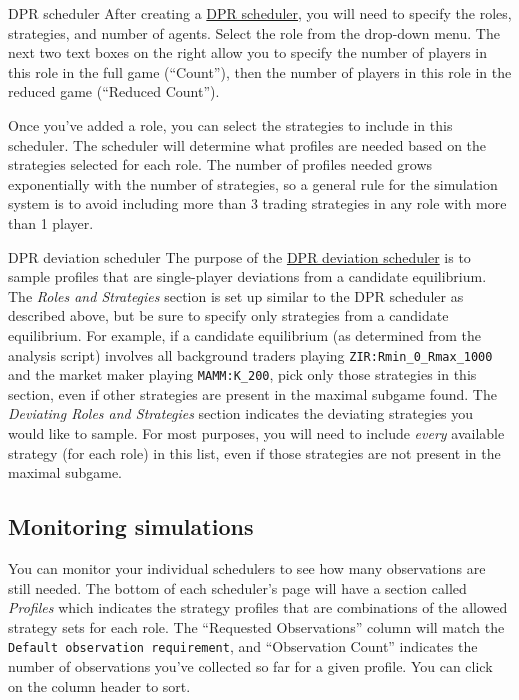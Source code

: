 \documentclass[11pt]{article}
\begin{document}
\begin{paragraph}{DPR scheduler}
After creating a \href{http://egtaonline.eecs.umich.edu/dpr_schedulers/new}{DPR scheduler}, you will need to specify the roles, strategies, and number of agents. Select the role from the drop-down menu. The next two text boxes on the right allow you to specify the number of players in this role in the full game (``Count''), then the number of players in this role in the reduced game (``Reduced Count''). 

Once you've added a role, you can select the strategies to include in this scheduler. The scheduler will determine what profiles are needed based on the strategies selected for each role.
The number of profiles needed grows exponentially with the number of strategies, so a general rule for the simulation system is to avoid including more than 3 trading strategies in any role with more than 1 player.
\end{paragraph}

\begin{paragraph}{DPR deviation scheduler}
The purpose of the \href{http://egtaonline.eecs.umich.edu/dpr_deviation_schedulers/new}{DPR deviation scheduler} is to sample profiles that are single-player deviations from a candidate equilibrium.
The \emph{Roles and Strategies} section is set up similar to the DPR scheduler as described above, but be sure to specify only strategies from a candidate equilibrium. For example, if a candidate equilibrium (as determined from the analysis script) involves all background traders playing \verb|ZIR:Rmin_0_Rmax_1000| and the market maker playing \verb|MAMM:K_200|, pick only those strategies in this section, even if other strategies are present in the maximal subgame found.
The \emph{Deviating Roles and Strategies} section indicates the deviating strategies you would like to sample. For most purposes, you will need to include \emph{every} available strategy (for each role) in this list, even if those strategies are not present in the maximal subgame.
\end{paragraph}


\subsection{Monitoring simulations}
You can monitor your individual schedulers to see how many observations are still needed. The bottom of each scheduler's page will have a section called \emph{Profiles} which indicates the strategy profiles that are combinations of the allowed strategy sets for each role. The ``Requested Observations'' column will match the \texttt{Default observation requirement}, and ``Observation Count'' indicates the number of observations you've collected so far for a given profile. You can click on the column header to sort.
\end{document}
